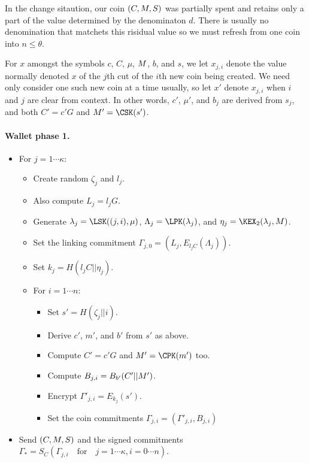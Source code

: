 \documentclass{llncs}
\begin{document}
In the change sitaution, our coin $(C,M,S)$ was partially spent and 
retains only a part of the value determined by the denominaton $d$.
There is usually no denomination that matchets this risidual value
so we must refresh from one coin into $n \le \theta$.

For $x$ amongst the symbols $c$, $C$, $\mu$, $M$, $b$, and $s$,
we let $x_{j,i}$ denote the value normally denoted $x$ of
 the $j$th cut of the $i$th new coin being created. 
We need only consider one such new coin at a time usually, 
so let $x'$ denote $x_{j,i}$ when $i$ and $j$ are clear from context.
In other words, $c'$, $\mu'$, and $b_j$ are derived from $s_j$,
 and both $C' = c' G$ and $\Mu' = \CSK(s')$.

\paragraph{Wallet phase 1.}
\begin{itemize}
\item  For $j=1 \cdots \kappa$:
   \begin{itemize}
   \item  Create random $\zeta_j$ and $l_j$.
   \item  Also compute $L_j = l_j G$.
   \item  Generate $\lambda_j = \LSK((j,i),\mu)$,
          $\Lambda_j = \LPK(\lambda_j)$, and
            $\eta_j = \KEX_2(\lambda_j,\Mu)$.
   \item  Set the linking commitment $\Gamma_{j,0} = (L_j,E_{l_j C}(\Lambda_j))$. 
   \item  Set $k_j = H(l_j C || \eta_j)$.
\smallskip
   \item  For $i=1 \cdots n$:
      \begin{itemize}
      \item  Set $s' = H(\zeta_j || i)$.
      \item  Derive $c'$, $m'$, and $b'$ from $s'$ as above.
      \item  Compute $C' = c' G$ and $\Mu' = \CPK(m')$ too.
      \item  Compute $B_{j,i} = B_{b'}(C' || M')$.
      \item  Encrypt $\Gamma'_{j,i} = E_{k_j}(s')$. 
      \item  Set the coin commitments $\Gamma_{j,i} = (\Gamma'_{j,i},B_{j,i})$
\end{itemize}
\smallskip
\end{itemize}
\item  Send $(C,M,S)$ and the signed commitments
   $\Gamma_* = S_C( \Gamma_{j,i} \quad\textrm{for}\quad j=1\cdots\kappa, i=0 \cdots n )$.
\end{itemize}
\end{document}

